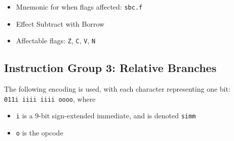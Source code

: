 \documentclass{article}
\begin{document}
\begin{itemize}
\begin{itemize}
		\item Mnemonic for when flags affected: \texttt{sbc.f}
		\item Effect Subtract with Borrow
		\item Affectable flags:
			\texttt{Z}, \texttt{C}, \texttt{V}, \texttt{N}
		\end{itemize}
	\end{itemize}


	\doublespacing
	\subsection{Instruction Group 3: Relative Branches}
	The following encoding is used, with each character representing one
	bit: \\
	\texttt{011i iiii iiii oooo}, where

	\singlespacing
	\begin{itemize}
	\item \texttt{i} is a 9-bit sign-extended immediate, and is denoted
	\texttt{simm}
	\item \texttt{o} is the opcode
	\end{itemize}
	\doublespacing
\end{document}
